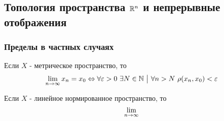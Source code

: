 \subsection{Топология пространства $\mathbb{R}^n$ и непрерывные отображения}

\subsubsection*{Пределы в частных случаях}

\begin{proposition}
	Если $X$ - метрическое пространство, то
	\[
		\lim\limits_{n \to \infty} x_n = x_0 \Leftrightarrow \forall \varepsilon > 0\ \exists N \in \mathbb{N} \ \big|\  \forall n > N\ \rho(x_n, x_0) < \varepsilon
	\]
\end{proposition}

\begin{proposition}
	Если $X$ - линейное нормированное пространство, то
	\[
		\lim\limits_{n \to \infty}
	\]
\end{proposition}

